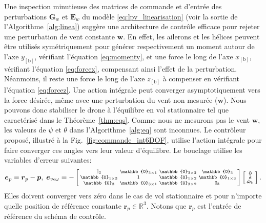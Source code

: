Une inspection minutieuse des matrices de commande et d'entrée des perturbations $\boldsymbol{G}_{w}$ et $\boldsymbol{E}_{w}$ du modèle \eqref{eq:lpv_linearisation} (voir la sortie de l'Algorithme~\ref{alg:linea}) suggère une architecture de contrôle efficace pour rejeter une perturbation de vent constante $\boldsymbol{w}$. En effet, les ailerons et les hélices peuvent être utilisés symétriquement pour générer respectivement un moment autour de l'axe $y_{[\text{b}]}$, vérifiant l'équation \eqref{eq:momenty}, et une force le long de l'axe $x_{[\text{b}]}$, vérifiant l'équation \eqref{eq:forcex}, compensant ainsi l'effet de la perturbation. Néanmoins, il reste une force le long de l'axe $z_{[\text{b}]}$ à compenser en vérifiant l'équation \eqref{eq:forcez}. Une action intégrale peut converger asymptotiquement vers la force désirée, même avec une perturbation du vent non mesurée ($\boldsymbol{w}$). Nous pouvons donc stabiliser le drone à l'équilibre en vol stationnaire tel que caractérisé dans le Théorème~\ref{thm:eqs}. Comme nous ne mesurons pas le vent $\boldsymbol{w}$, les valeurs de $\psi$ et $\theta$ dans l'Algorithme~\ref{alg:eq} sont inconnues. Le contrôleur proposé, illustré à la Fig.~\ref{fig:commande_int6DOF}, utilise l'action intégrale pour faire converger ces angles vers leur valeur d'équilibre. Le bouclage utilise les variables d'erreur suivantes: 
\begin{align}
    \boldsymbol{e}_{p}= \boldsymbol{r}_{p} - \boldsymbol{p}, \; \boldsymbol{e}_{v \epsilon \omega} = -  
       \left[ \begin{smallmatrix} \mathbb{I}_{3}  & \mathbb{0}_{3\times 1} & \mathbb{0}_{3\times 2} & \mathbb{0}_{3}\\
       \mathbb{0}_{1\times 3}  & 1 & \mathbb{0}_{1\times 2} & \mathbb{0}_{1 \times 3} \\
           \mathbb{0}_{3}  & \mathbb{0}_{3\times 1} & \mathbb{0}_{3\times 2} &   \mathbb{I}_{3}
           \end{smallmatrix} \right]
    \smallmat{
           \tilde{\boldsymbol{v}} \\
           \tilde{\boldsymbol{\epsilon}} \\
           \tilde{\boldsymbol{\omega}}_{\text{b}} 
    }.
  \label{eq:error_var}
\end{align} 
Elles doivent converger vers zéro dans le cas de vol stationnaire et pour n'importe quelle position de référence constante $\boldsymbol{r}_{p} \in \mathbb{R}^{3}$. Notons que $\boldsymbol{r}_{p}$ est l'entrée de référence du schéma de contrôle.

